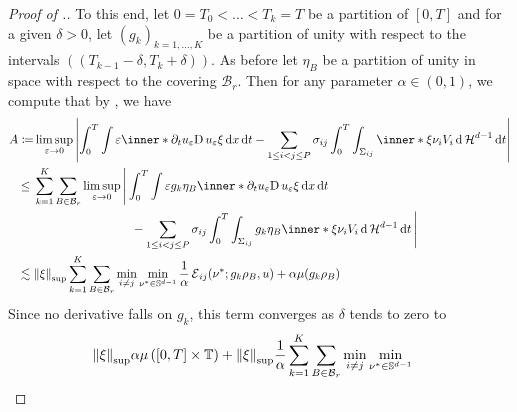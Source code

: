 \begin{proof}[Proof of .]
	To this end, let $ 0 = T_{ 0 } < \dotsc < T_{ k } = T $ be a partition of $ 
	[ 0 , T ] $ and for a given $ \delta > 0 $, let $ ( g_{ k } )_{ k = 1 , 
	\dotsc, K } $ be a partition of unity with respect to the intervals 
	$ \left( ( T_{ k - 1 } - \delta , T_{ k } + \delta ) \right) $. As before 
	let $ \eta_{ B } $ be a partition of unity in space with respect to the 
	covering $ \mathcal{ B }_{ r } $. Then for any parameter $ \alpha \in ( 0 , 
	1 ) $, we compute that by , we have
	\begin{align*}
		A \coloneqq&
		\limsup_{ \varepsilon \to 0 }
			\abs{
				\int_{ 0 }^{ T }
					\int
						\varepsilon
						\inner*{ \partial_{ t } 
							u_{ \varepsilon } }{ \diff u_{ \varepsilon } \xi }
					\dd{ x }
				\dd{ t }
				-
				\sum_{ 1 \leq i < j \leq P }
					\sigma_{ i j }
					\int_{ 0 }^{ T }
						\int_{ \Sigma_{ i j } }
							\inner*{ \xi }{ \nu_{ i } }
							V_{ i }
						\dd{ \hm^{ d -1 } }
					\dd{ t }
			}
		\\
		\leq{} &
		\sum_{ k = 1 }^{ K }
			\sum_{ B \in \mathcal{ B }_{ r } }
				\limsup_{ \varepsilon \to 0 }
					\Bigg{|}
						\int_{ 0 }^{ T }
							\int
								\varepsilon
								g_{ k } \eta_{ B }
								\inner*{ 
									\partial_{ t } u_{ \varepsilon } }{ \diff 
									u_{ \varepsilon } \xi }
							\dd{ x }
						\dd{ t }
		\\
						& \qquad \qquad \qquad \qquad-
						\sum_{ 1 \leq i < j \leq P }
							\sigma_{ i j }
							\int_{ 0 }^{ T }
								\int_{ \Sigma_{ i j } }
									g_{ k } \eta_{ B }
									\inner*{\xi }{ \nu_{ i } }
									V_{ i }
								\dd{ \hm^{ d - 1 } }
							\dd{ t }					
					\Bigg{|}
		\\
		\lesssim{} &
		\norm{ \xi }_{ \mathrm{sup} }
		\sum_{ k = 1 }^{ K }
			\sum_{ B \in \mathcal{ B }_{ r } }
				\min_{ i \neq j }
					\min_{ \nu^{ \ast } \in \mathbb{ S }^{ d - 1 } }
						\frac{ 1 }{ \alpha }
						\tilt_excess_{ i j } ( \nu^{ \ast } ; g_{ k } \rho_{ 
						B } , u )
						+
						\alpha \mu ( g_{ k } \rho_{ B } )
	\end{align*}
	Since no derivative falls on $ g_{ k } $, this term converges as $ \delta $ 
	tends to zero to
	\begin{align}
		\label{error_for _convergence_of_velocity}
		\norm{ \xi }_{ \mathrm{sup} }
		\alpha \mu \left( [ 0 , T ] \times \flattorus \right)
		+
		\norm{ \xi }_{ \mathrm{sup} }
		\frac{ 1 }{ \alpha }
		\sum_{ k = 1 }^{ K }
			\sum_{ B \in \mathcal{ B }_{ r } }
				& \min_{ i \neq j }
					\min_{ \nu^{ \ast } \in \mathbb{ S }^{ d - 1 } }

\end{align}
\end{proof}
